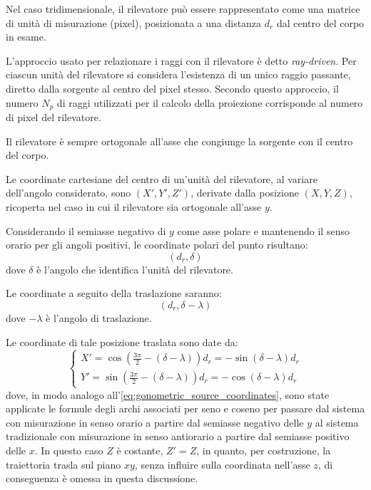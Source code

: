 \documentclass[12pt,a4paper]{report}
\begin{document}
Nel caso tridimensionale, il rilevatore può essere rappresentato come una matrice di unità di misurazione (pixel), posizionata a
una distanza \(d_r\) dal centro del corpo in esame.

L'approccio usato per relazionare i raggi con il rilevatore è detto \textit{ray-driven}.
Per ciascun unità del rilevatore si considera l'esistenza di un unico raggio passante, diretto dalla sorgente al centro del
pixel stesso.
Secondo questo approccio, il numero \(N_p\) di raggi utilizzati per il calcolo della proiezione corrisponde al numero di pixel
del rilevatore.

Il rilevatore è sempre ortogonale all'asse che congiunge la sorgente con il centro del corpo.

Le coordinate cartesiane del centro di un'unità del rilevatore, al variare dell'angolo considerato, sono \((X', Y', Z')\),
derivate dalla posizione \((X, Y, Z)\), ricoperta nel caso in cui il rilevatore sia ortogonale all'asse \(y\).

Considerando il semiasse negativo di \(y\) come asse polare e mantenendo il senso orario per gli angoli positivi, le coordinate
polari del punto risultano:
\begin{equation*}
  (d_r, \delta)
\end{equation*}
dove \(\delta\) è l'angolo che identifica l'unità del rilevatore.

Le coordinate a seguito della traslazione saranno:
\begin{equation*}
  (d_r, \delta - \lambda)
\end{equation*}
dove \(-\lambda\) è l'angolo di traslazione.

Le coordinate di tale posizione traslata sono date da:
\begin{equation} \label{eq:goniometric_detector_coordinates}
  \begin{cases}
    X' = \cos(\frac{3\pi}{2} - (\delta - \lambda)) d_r = -\sin(\delta - \lambda) d_r \\
    Y' = \sin(\frac{3\pi}{2} - (\delta - \lambda)) d_r = -\cos(\delta - \lambda) d_r
  \end{cases}
\end{equation}
dove, in modo analogo all'\autoref{eq:gonometric_source_coordinates}, sono state applicate le formule degli archi associati per
seno e coseno per passare dal sistema con misurazione in senso orario a partire dal semiasse negativo delle \(y\) al sistema
tradizionale con misurazione in senso antiorario a partire dal semiasse positivo delle \(x\).
In questo caso \(Z\) è costante, \(Z' = Z\), in quanto, per costruzione, la traiettoria trasla sul piano \(xy\), senza influire
sulla coordinata nell'asse \(z\), di conseguenza è omessa in questa discussione.
\end{document}
